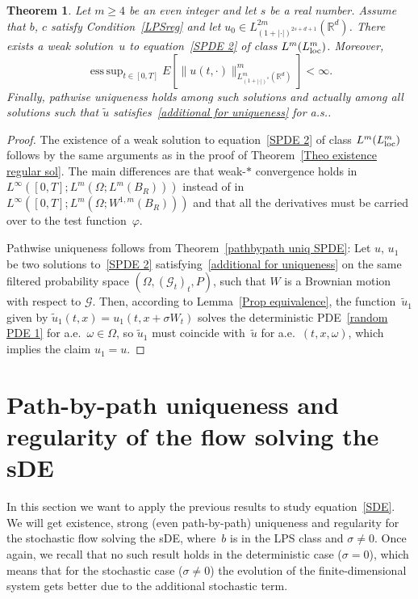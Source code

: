 \documentclass[a4paper,10pt]{article}
\newtheorem{theorem}{Theorem}[section]
\newcommand\1{\mathbbm{1}}
\newcommand{\mr}{\mathbb{R}}
\newcommand{\mc}{\mathcal}
\newcommand{\td}{\tilde}
\newcommand\loc{{\rm loc}}
\DeclareMathOperator*{\esssup}{ess\,sup}
\numberwithin{equation}{section}
\begin{document}
\begin{theorem}\label{existence CE}
Let $m \geq 4$ be an even integer and let $s$ be a real number. Assume that $b$, $c$ satisfy Condition~\ref{LPSreg} and let $u_0 \in L^{2m}_{(1+|\cdot|)^{2s+d+1}}(\mr^d)$. There exists a weak solution~$u$ to equation~\eqref{SPDE 2} of class $L^{m}(L^{m}_\loc)$. Moreover, 
\begin{equation*}
\esssup_{t\in[0,T]}E\left[\|u(t,\cdot)\|_{L^m_{(1+|\cdot|)^s}(\mr^d)}^m\right] <\infty .
\end{equation*}
Finally, pathwise uniqueness holds among such solutions and actually among all solutions such that $\td{u}$ satisfies~\eqref{additional for uniqueness} for a.s..
\end{theorem}

\begin{proof}
The existence of a weak solution to equation~\eqref{SPDE 2} of class $L^{m}(L^{m}_\loc)$ follows by the same arguments as in the proof of Theorem~\ref{Theo existence regular sol}. The main differences are that weak-$*$ convergence holds in $L^\infty([0,T];L^m(\Omega;L^m(B_R)))$ instead of in $L^\infty([0,T];L^m(\Omega;W^{1,m}(B_R)))$ and that all the derivatives must be carried over to the test function~$\varphi$.

Pathwise uniqueness follows from Theorem~\ref{pathbypath uniq SPDE}: Let $u$, $u_1$ be two solutions to~\eqref{SPDE 2} satisfying~\eqref{additional for uniqueness} on the same filtered probability space $(\Omega,(\mc{G}_t)_t,P)$, such that $W$ is a Brownian motion with respect to $\mc{G}$. Then, according to Lemma~\ref{Prop equivalence}, the function~$\td{u}_1$ given by $\td{u}_1(t,x) =u_1(t,x+\sigma W_t)$ solves the deterministic PDE~\eqref{random PDE 1} for a.e.~$\omega \in \Omega$, so $\td{u}_1$ must coincide with~$\td{u}$ for a.e.~$(t,x,\omega)$, which implies the claim $u_1=u$. 
\end{proof}


\section{Path-by-path uniqueness and regularity of the flow solving the sDE}\label{section flow}

In this section we want to apply the previous results to study equation~\eqref{SDE}. We will get existence, strong (even path-by-path) uniqueness and regularity for the stochastic flow solving the sDE, where~$b$ is in the LPS class and $\sigma\neq0$. Once again, we recall that no such result holds in the deterministic case ($\sigma=0$), which means that for the stochastic case ($\sigma \neq 0$) the evolution of the finite-dimensional system gets better due to the additional stochastic term.
\end{document}
